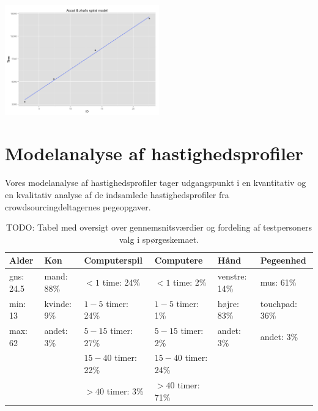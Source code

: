 \begin{minipage}{\linewidth}
	\begin{minipage}[t]{\linewidth}
		\centering
		\includegraphics[width=0.5\textwidth]{images/plots/plot_model_spiral_accot}
		\label{fig:accot_spiral_line}
	\end{minipage}
\end{minipage}

\newpage
{}
\section*{Modelanalyse af hastighedsprofiler}
Vores modelanalyse af hastighedsprofiler tager udgangspunkt i en kvantitativ og en kvalitativ analyse af de indsamlede hastighedsprofiler fra crowdsourcingdeltagernes pegeopgaver.

\begin{table}[h]
	\centering
	\begin{tabular}{llllll}
		Alder           & Køn               & Computerspil              & Computere                 & Hånd                & Pegeenhed            \\\hline
		gns: \hfill24.5 & mand: \hfill88\%  & $<1$ time: \hfill24\%     & $<1$ time: \hfill2\%      & venstre: \hfill14\% & mus: \hfill61\%      \\
		min: \hfill13   & kvinde: \hfill9\% & $1-5$ timer: \hfill24\%   & $1-5$ timer: \hfill1\%    & højre: \hfill83\%   & touchpad: \hfill36\% \\
		max: \hfill62   & andet: \hfill3\%  & $5-15$ timer: \hfill27\%  & $5-15$ timer: \hfill2\%   & andet: \hfill3\%    & andet: \hfill3\%     \\
		                &                   & $15-40$ timer: \hfill22\% & $15-40$ timer: \hfill24\% &                     &\\
		                &                   & $>40$ timer: \hfill3\%    & $>40$ timer: \hfill71\%   &                     &
	\end{tabular}
	\caption{TODO: Tabel med oversigt over gennemsnitsværdier og fordeling af testpersoners valg i spørgeskemaet.}
	\label{tab:persons_average}
\end{table}

